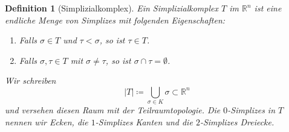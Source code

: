 \documentclass[11pt,a4paper,toc=bibliography]{scrartcl}
\theoremstyle{def}
\newtheorem{defi}{Definition}[section]
\theoremstyle{thm}
\theoremstyle{remark}
\begin{document}
\begin{defi}[Simplizialkomplex]
Ein \emph{Simplizialkomplex} $T$ im $\mathbb{R}^n$ ist eine endliche Menge von Simplizes mit folgenden Eigenschaften:
\begin{enumerate}
    \item Falls $\sigma\in T$ und $\tau<\sigma$, so ist $\tau\in T$.
    \item Falls $\sigma,\tau\in T$ mit $\sigma\neq\tau$, so ist $\sigma\cap\tau=\emptyset$.
\end{enumerate}
Wir schreiben
\[
|T|\coloneqq \bigcup_{\sigma \in K} \sigma \subset \mathbb{R}^n
\]
und versehen diesen Raum mit der Teilraumtopologie. Die $0$-Simplizes in $T$ nennen wir \emph{Ecken}, die $1$-Simplizes \emph{Kanten} und die $2$-Simplizes \emph{Dreiecke}.
\end{defi}
\end{document}

